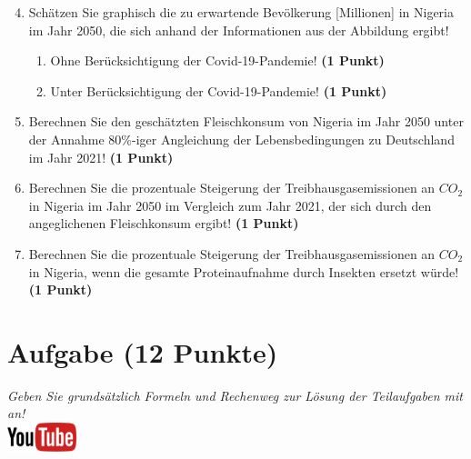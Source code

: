 \documentclass[a4paper, 9pt]{scrartcl}\usepackage[]{graphicx}\usepackage[]{xcolor}
\begin{document}
\begin{enumerate}
  \setcounter{enumi}{3}  
\item Sch{\"a}tzen Sie graphisch die zu erwartende Bev{\"o}lkerung [Millionen] in Nigeria im
  Jahr 2050, die sich anhand der Informationen aus der Abbildung ergibt!
\begin{enumerate}
\item Ohne Ber{\"u}cksichtigung der Covid-19-Pandemie! \textbf{(1
    Punkt)}
\item Unter Ber{\"u}cksichtigung der Covid-19-Pandemie! \textbf{(1
    Punkt)}
\end{enumerate}
\item Berechnen Sie den gesch{\"a}tzten Fleischkonsum von Nigeria im Jahr
  2050 unter der Annahme 80\%-iger Angleichung der Lebensbedingungen zu
  Deutschland im Jahr 2021! \textbf{(1 Punkt)}
\item Berechnen Sie die prozentuale Steigerung der Treibhausgasemissionen
  an $CO_2$ in Nigeria im Jahr 2050 im Vergleich zum Jahr 2021, der
  sich durch den angeglichenen Fleischkonsum ergibt! \textbf{(1 Punkt)}
\item Berechnen Sie die prozentuale Steigerung der Treibhausgasemissionen
  an $CO_2$ in Nigeria, wenn die gesamte Proteinaufnahme 
  durch Insekten ersetzt w{\"u}rde! \textbf{(1
    Punkt)}
\end{enumerate}







 
\clearpage

\section{Aufgabe \hfill (12 Punkte)}

\textit{Geben Sie grunds{\"a}tzlich Formeln und Rechenweg zur L{\"o}sung der
  Teilaufgaben mit an!} \\[1Ex]

\hfill\href{https://youtu.be/flRBo1FWQy0}{\includegraphics[width = 2cm]{img/youtube}} %
\hspace{2Ex}
\end{document}
